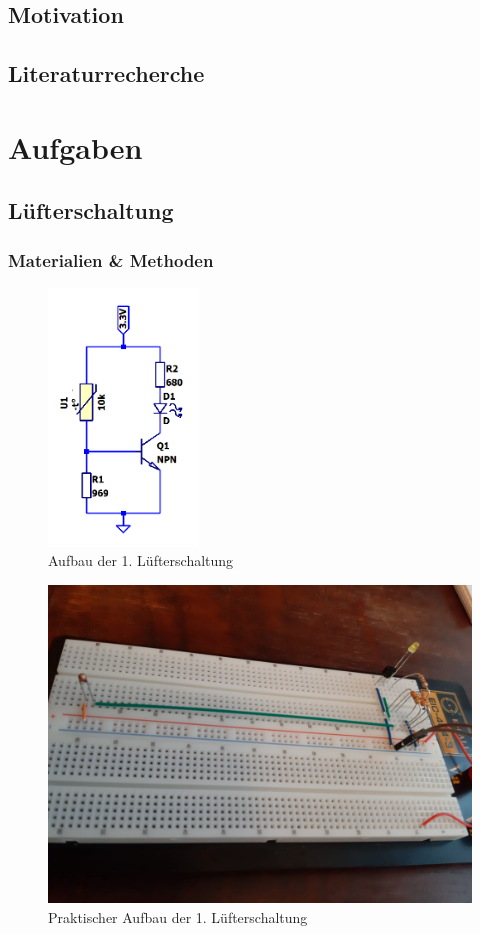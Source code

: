 \subsection{Motivation}


\subsection{Literaturrecherche}


\clearpage
\section{Aufgaben}

\subsection{Lüfterschaltung}

\subsubsection{Materialien \& Methoden}

\begin{figure}[htb]
    \includegraphics[width=4cm]{./res/Luefter_1_Spice}
    \caption{Aufbau der 1. Lüfterschaltung}
    \label{fig:Lüfterschaltung1}
\end{figure}

\begin{figure}[htb]
    \includegraphics[width=12cm]{./res/Luefter_1_Aufbau}
    \caption{Praktischer Aufbau der 1. Lüfterschaltung}
    \label{fig:Lüfterschaltung1Praktisch}
\end{figure}

